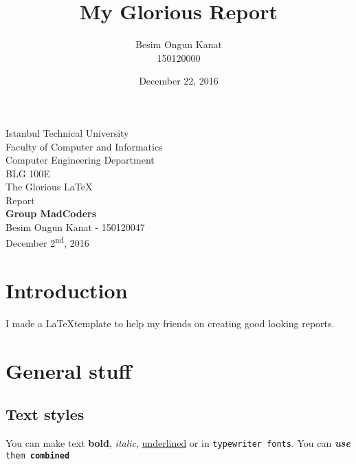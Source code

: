 \documentclass[a4paper, 12pt, titlepage]{article}
\title{My Glorious Report}
\author{Besim Ongun Kanat \\ 150120000}
\date{December 22, 2016}
\begin{document}


\begin{titlepage}
	\begin{center}
		\large{Istanbul Technical University \\ Faculty of Computer and Informatics \\ Computer Engineering Department} \\
		\vspace{150pt}
		\Large{BLG 100E \\ The Glorious \LaTeX \\ Report}  \\
		\vspace{30pt}
		\Large{\textbf{Group MadCoders}} \\
		\large{Besim Ongun Kanat - 150120047} \\
		\vspace{\fill} %
		\large{December 2\textsuperscript{nd}, 2016}
	\end{center}
\end{titlepage}
\newpage
\tableofcontents
\newpage

\section{Introduction}
I made a \LaTeX template to help my friends on creating good looking reports.

\section{General stuff}
\subsection{Text styles}
You can make text \textbf{bold}, \textit{italic}, \underline{underlined} or in \texttt{typewriter fonts}. You can \textit{\textbf{use}} \texttt{them \textbf{combined}}
\end{document}
